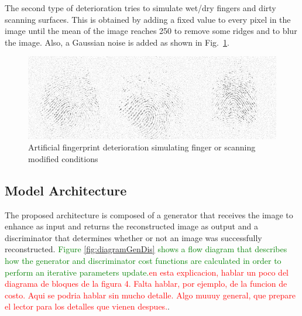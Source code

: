 \documentclass[a4paper,fleqn]{cas-dc}
\begin{document}
The second type of deterioration tries to simulate wet/dry fingers and dirty scanning surfaces. This is obtained by adding a fixed value to every pixel in the image until the mean of the image reaches 250 to remove some ridges and to blur the image. Also, a Gaussian noise is added as shown in Fig.~\ref{fig3}.
\begin{figure}[ht]
\centerline{\includegraphics[scale=0.32]{figs/deterioration_2.png}}
\caption{Artificial fingerprint deterioration simulating finger or scanning modified conditions}
\label{fig3}
\end{figure}


\subsection{Model Architecture}\label{sec:MA}
The proposed architecture is composed of a generator that receives the image to enhance as input and returns the reconstructed image as output and a discriminator that determines whether or not an image was successfully reconstructed. \textcolor{green}{Figure \ref{fig:diagramGenDis} shows a flow diagram that describes how the generator and discriminator cost functions are calculated in order to perform an iterative parameters update.}\textcolor{red}{en esta explicacion, hablar un poco del diagrama de bloques de la figura 4. Falta hablar, por ejemplo, de la funcion de costo. Aqui se podria hablar sin mucho detalle. Algo muuuy general, que prepare el lector para los detalles que vienen despues.}.
\end{document}
